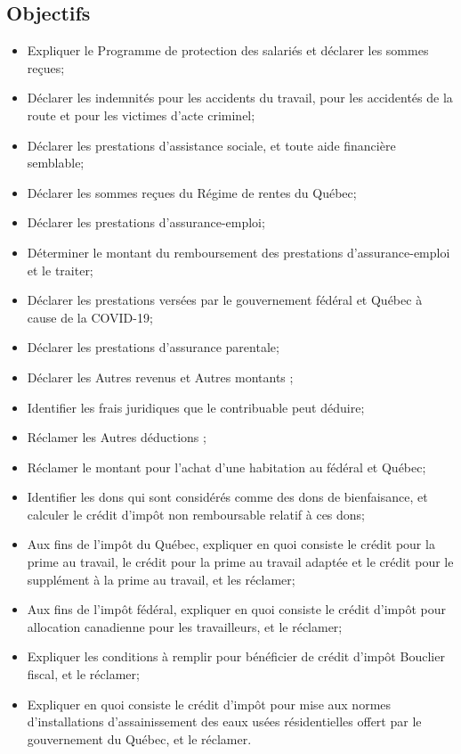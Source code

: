 \subsection{Objectifs}
\begin{itemize}[label=]
	\item Expliquer le Programme de protection des salariés et déclarer les sommes reçues;
	\item Déclarer les indemnités pour les accidents du travail, pour les accidentés de la route et pour les victimes d'acte criminel;
	\item Déclarer les prestations d'assistance sociale, et toute aide financière semblable;
	\item Déclarer les sommes reçues du Régime de rentes du Québec;
	\item Déclarer les prestations d'assurance-emploi;
	\item Déterminer le montant du remboursement des prestations d'assurance-emploi et le traiter;
	\item Déclarer les prestations versées par le gouvernement fédéral et Québec à cause de la COVID-19;
	\item Déclarer les prestations d'assurance parentale;
	\item Déclarer les \og Autres revenus \fg{} et \og Autres montants \fg{};
	\item Identifier les frais juridiques que le contribuable peut déduire;
	\item Réclamer les \og Autres déductions \fg{};
	\item Réclamer le montant pour l'achat d'une habitation au fédéral et Québec;
	\item Identifier les dons qui sont considérés comme des dons de bienfaisance, et calculer le crédit d'impôt non remboursable relatif à ces dons;
	\item Aux fins de l'impôt du Québec, expliquer en quoi consiste le crédit pour la prime au travail, le crédit pour la prime au travail adaptée et le crédit pour le supplément à la prime au travail, et les réclamer;
	\item Aux fins de l'impôt fédéral, expliquer en quoi consiste le crédit d'impôt pour allocation canadienne pour les travailleurs, et le réclamer;
	\item Expliquer les conditions à remplir pour bénéficier de crédit d'impôt Bouclier fiscal, et le réclamer;
	\item Expliquer en quoi consiste le crédit d'impôt pour mise aux normes d'installations d'assainissement des eaux usées résidentielles offert par le gouvernement du Québec, et le réclamer.
\end{itemize}


